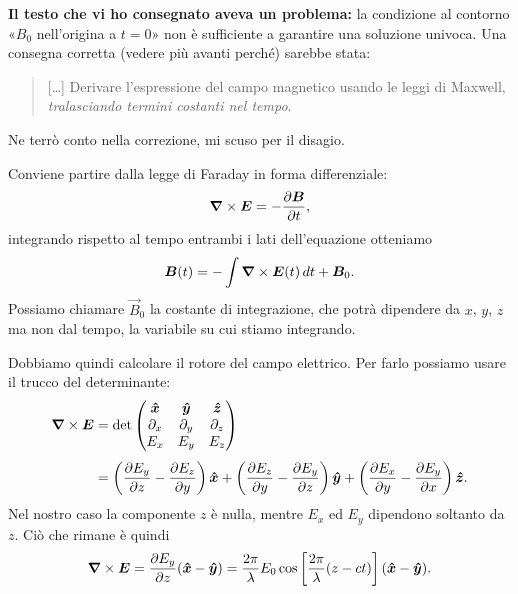\documentclass[10pt]{gulartcl}
\begin{document}
\begin{solution}
\textbf{Il testo che vi ho consegnato aveva un problema:} la
condizione al contorno «$B_0$ nell’origina a $t = 0$» non è sufficiente a
garantire una soluzione univoca. Una consegna corretta (vedere più avanti
perché) sarebbe stata:
\begin{quote}
    […] Derivare l’espressione del campo magnetico usando le leggi di
    Maxwell, \emph{tralasciando termini costanti nel tempo}.
\end{quote}
Ne terrò conto nella correzione, mi scuso per il
disagio.

Conviene partire dalla legge di Faraday in forma differenziale:
\begin{equation}
    \curl{E} = -\pdiff{\vec{B}}{t},
\end{equation}
integrando rispetto al tempo entrambi i lati dell’equazione otteniamo
\begin{equation}
    \bm{B}(t) = -\int \bm{\nabla}\times\bm{E}(t) \, dt + \bm{B}_0.
    \label{eq:B(t)-final}
\end{equation}
Possiamo chiamare $\vec{B}_0$ la costante di integrazione, che potrà
dipendere da $x$, $y$, $z$ ma non dal tempo, la variabile su cui stiamo
integrando.

Dobbiamo quindi calcolare il rotore del campo elettrico. Per farlo
possiamo usare il trucco del determinante:
\begin{equation}
\begin{split} 
    \curl{E} &= \det
    \begin{pmatrix}
        \uvec{x} & \uvec{y} & \uvec{z} \\
        \partial_x & \partial_y & \partial_z \\
        E_x & E_y & E_z
    \end{pmatrix} \\[0.25\baselineskip]
             &= \left(\pdiff{E_y}{z} - \pdiff{E_z}{y}\right) \uvec{x}
              + \left(\pdiff{E_z}{y} - \pdiff{E_y}{z}\right) \uvec{y}
              + \left(\pdiff{E_x}{y} - \pdiff{E_y}{x}\right) \uvec{z}.
\end{split}
\end{equation}
Nel nostro caso la componente $z$ è nulla, mentre $E_x$ ed $E_y$ dipendono
soltanto da $z$. Ciò che rimane è quindi
\begin{equation}
    \curl{E} = \pdiff{E_y}{z} (\uvec{x} - \uvec{y})
    = \frac{2\pi}{\lambda} E_0
      \cos\left[\frac{2\pi}{\lambda}(z - ct)\right] (\uvec{x} - \uvec{y}).
\end{equation}


\end{solution}
\end{document}
